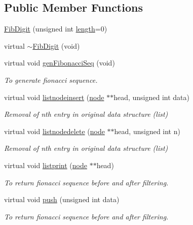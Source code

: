 \subsection*{Public Member Functions}
\begin{DoxyCompactItemize}
\item 
\mbox{\hyperlink{classFibDigit_a5e31b225ec07653382a024d60ac47c68}{Fib\+Digit}} (unsigned int \mbox{\hyperlink{classFibDigit_a70d34085c62bdfb57390cc0ed04f9574}{length}}=0)
\item 
virtual \mbox{\hyperlink{classFibDigit_acd91f7e31add488e19f65675daaca7ea}{$\sim$\+Fib\+Digit}} (void)
\item 
virtual void \mbox{\hyperlink{classFibDigit_a66987864f12e264e1a088c9a394e9bb4}{gen\+Fibonacci\+Seq}} (void)
\begin{DoxyCompactList}\small\item\em To generate fionacci sequence. \end{DoxyCompactList}\item 
virtual void \mbox{\hyperlink{classFibDigit_a6cfa565c583a0209b857445bcb788624}{listnodeinsert}} (\mbox{\hyperlink{structnode}{node}} $\ast$$\ast$head, unsigned int data)
\begin{DoxyCompactList}\small\item\em Removal of nth entry in original data structure (list) \end{DoxyCompactList}\item 
virtual void \mbox{\hyperlink{classFibDigit_a4f2ec44ac3d289a908cfdf11b2d84a59}{listnodedelete}} (\mbox{\hyperlink{structnode}{node}} $\ast$$\ast$head, unsigned int n)
\begin{DoxyCompactList}\small\item\em Removal of nth entry in original data structure (list) \end{DoxyCompactList}\item 
virtual void \mbox{\hyperlink{classFibDigit_af3285f686c8e8968dc604388b9ee65be}{listprint}} (\mbox{\hyperlink{structnode}{node}} $\ast$$\ast$head)
\begin{DoxyCompactList}\small\item\em To return fionacci sequence before and after filtering. \end{DoxyCompactList}\item 
virtual void \mbox{\hyperlink{classFibDigit_a4ff36c80f50d8fa62e6d691e6264b6e5}{push}} (unsigned int data)
\begin{DoxyCompactList}\small\item\em To return fionacci sequence before and after filtering. \end{DoxyCompactList}\item 
$$
\end{DoxyCompactItemize}
